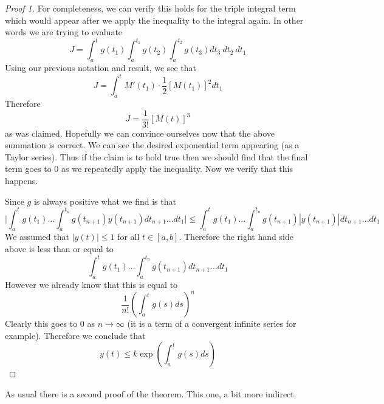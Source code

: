 \begin{proof}[Proof 1]
    For completeness, we can verify this holds for the triple integral term which would appear after we apply the inequality to the integral again. In other words we are trying to evaluate
    $$ J = \int_a^t g(t_1) \int_a^{t_1} g(t_2) \int_a^{t_2} g(t_3) dt_3 \ dt_2 \ dt_1 $$
    Using our previous notation and result, we see that
    $$ J = \int_a^t M'(t_1) \cdot \frac{1}{2} [M(t_1)]^2 dt_1 $$
    Therefore
    $$ J = \frac{1}{3!} [M(t)]^3 $$
    as was claimed. Hopefully we can convince ourselves now that the above summation is correct. We can see the desired exponential term appearing (as a Taylor series). Thus if the claim is to hold true then we should find that the final term goes to 0 as we repeatedly apply the inequality. Now we verify that this happens.
    
    Since $g$ is always positive what we find is that
    $$ \bigg| \int_a^t g(t_1) \dots \int_a^{t_n} g(t_{n+1}) y(t_{n + 1}) dt_{n+1}\dots dt_1 \bigg| \leq \int_a^t g(t_1) \dots \int_a^{t_n} g(t_{n+1}) |y(t_{n + 1})| dt_{n+1}\dots dt_1 $$
    We assumed that $|y(t)| \leq 1$ for all $t \in [a, b]$. Therefore the right hand side above is less than or equal to
    $$\int_a^t g(t_1) \dots \int_a^{t_n} g(t_{n+1}) dt_{n+1}\dots dt_1 $$
    However we already know that this is equal to
    $$ \frac{1}{n!} \left( \int_a^t g(s)ds \right)^n $$
    Clearly this goes to 0 as $n \to \infty$ (it is a term of a convergent infinite series for example). Therefore we conclude that 
    $$y(t) \leq k \exp \left( \int_a^t g(s) ds \right)$$
\end{proof}
As usual there is a second proof of the theorem. This one, a bit more indirect.
